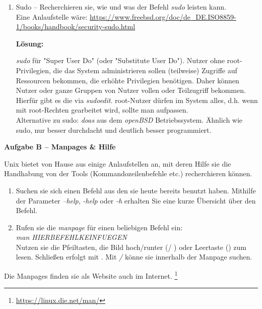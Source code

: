 \documentclass[paper=a4,fontsize=11pt]{scrartcl}%
\numberwithin{equation}{section}
\newenvironment{solution}
	{
		\color{blue}
		\textbf{Lösung:}
	}{}
\begin{document}
\begin{enumerate}
\begin{enumerate}
\begin{itemize}
\begin{figure}[h]
       			\end{figure}
        		\end{itemize}
        \end{enumerate}
        \item Sudo -- Recherchieren sie, wie und was der Befehl \emph{sudo} leisten kann.\\
        Eine Anlaufstelle wäre: \url{https://www.freebsd.org/doc/de_DE.ISO8859-1/books/handbook/security-sudo.html}
        
		\begin{solution}
		\emph{sudo} für "Super User Do" (oder "Substitute User Do"). Nutzer ohne root-Privilegien, die das System administrieren sollen (teilweise) Zugriffe auf Ressourcen bekommen, die erhöhte Privilegien benötigen. Daher können Nutzer oder ganze Gruppen von Nutzer vollen oder Teilzugriff bekommen. Hierfür gibt es die  via \emph{sudoedit}. root-Nutzer dürfen im System alles, d.h. wenn mit root-Rechten gearbeitet wird, sollte man aufpassen.\\
		Alternative zu sudo: \emph{doas} aus dem \emph{openBSD} Betriebssystem. Ähnlich wie sudo, nur besser durchdacht und deutlich besser programmiert.
		\end{solution}
\end{enumerate}

\begin{center}\Large{\textbf{Aufgabe B -- Manpages \& Hilfe}}\end{center}\vskip0.25in
Unix bietet von Hause aus einige Anlaufstellen an, mit deren Hilfe sie die Handhabung von der Tools (Kommandozeilenbefehle etc.) recherchieren können.
\begin{enumerate}
	\item Suchen sie sich einen Befehl aus den sie heute bereits benutzt haben. Mithilfe der Parameter \emph{--help}, \emph{-help} oder \emph{-h} erhalten Sie eine kurze Übersicht über den Befehl.
    \item Rufen sie die \emph{manpage} für einen beliebigen Befehl ein: \\
    		\emph{man HIERBEFEHLKEINFUEGEN}\\
		 Nutzen sie die Pfeiltasten, die Bild hoch/runter (/ ) oder Leertaste (\keys{\Space}) zum lesen. Schließen erfolgt mit . Mit \emph{/} könne sie innerhalb der Manpage suchen.
\end{enumerate}
Die Manpages finden sie als Website auch im Internet. \footnote{\url{https://linux.die.net/man/}}
\end{document}
